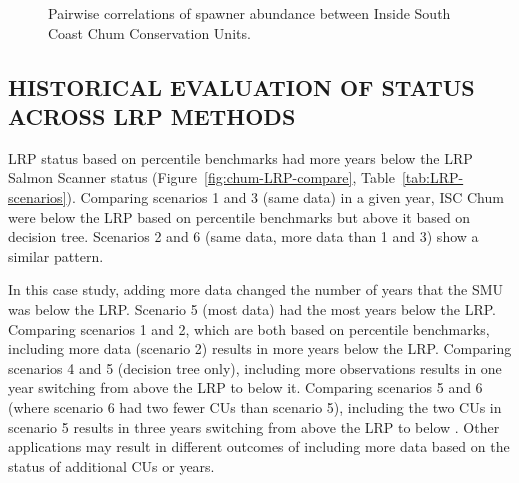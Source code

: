 \documentclass[11pt]{book}
\begin{document}
\begin{figure}[htb]

{\centering {} 

}

\caption{Pairwise correlations of spawner abundance between Inside South Coast Chum Conservation Units.}\label{fig:chum-spawner-corr}
\end{figure}
\hypertarget{historical-evaluation-of-status-across-lrp-methods-2}{%
\subsection{HISTORICAL EVALUATION OF STATUS ACROSS LRP METHODS}\label{historical-evaluation-of-status-across-lrp-methods-2}}

LRP status based on percentile benchmarks had more years below the LRP Salmon Scanner status (Figure~\ref{fig:chum-LRP-compare}, Table~\ref{tab:LRP-scenarios}). Comparing scenarios 1 and 3 (same data) in a given year, ISC Chum were below the LRP based on percentile benchmarks but above it based on decision tree. Scenarios 2 and 6 (same data, more data than 1 and 3) show a similar pattern.

In this case study, adding more data changed the number of years that the SMU was below the LRP. Scenario 5 (most data) had the most years below the LRP. Comparing scenarios 1 and 2, which are both based on percentile benchmarks, including more data (scenario 2) results in more years below the LRP. Comparing scenarios 4 and 5 (decision tree only), including more observations results in one year switching from above the LRP to below it. Comparing scenarios 5 and 6 (where scenario 6 had two fewer CUs than scenario 5), including the two CUs in scenario 5 results in three years switching from above the LRP to below . Other applications may result in different outcomes of including more data based on the status of additional CUs or years.
\end{document}
